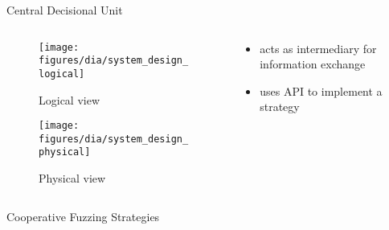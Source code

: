 \documentclass[\HandoutMode,table]{beamer}
\begin{document}
\begin{frame}{Central Decisional Unit}
    \begin{columns}
        \begin{column}{.5\textwidth}
            \begin{figure}
                \texttt{[image: figures/dia/system\_design\_logical]}
                \caption{Logical view}
            \end{figure}
            \begin{figure}
                \texttt{[image: figures/dia/system\_design\_physical]}
                \caption{Physical view}
            \end{figure}
        \end{column}
        \begin{column}{.5\textwidth}
            \begin{itemize}
                \item{} acts as intermediary for information exchange
                \item{} uses API to implement a strategy
            \end{itemize}
        \end{column}
    \end{columns}
\end{frame}

\begin{frame}[fragile]{Cooperative Fuzzing Strategies}
\end{frame}
\end{document}
